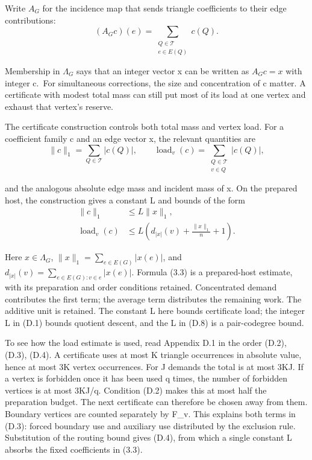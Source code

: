 \documentclass[english,11pt,a4paper]{article}
\begin{document}
Write \(A_G\) for the incidence map that sends triangle coefficients to their edge contributions:
\[(A_Gc)(e)=\sum_{\substack{Q\in\mathcal T\\e\in E(Q)}}c(Q).
                                                                    \tag{3.1}\]

Membership in \(\Lambda_G\) says that an integer vector x can be written as \(A_Gc=x\) with integer c.~For simultaneous corrections, the size and concentration of c matter. A certificate with modest total mass can still put most of its load at one vertex and exhaust that vertex's reserve.

The certificate construction controls both total mass and vertex load. For a coefficient family c and an edge vector x, the relevant quantities are
\[\|c\|_1=\sum_{Q\in\mathcal T}|c(Q)|,
\qquad
\operatorname{load}_v(c)=\sum_{\substack{Q\in\mathcal T\\v\in Q}}|c(Q)|,
                                                                    \tag{3.2}\]

and the analogous absolute edge mass and incident mass of x. On the prepared host, the construction gives a constant L and bounds of the form
\[\begin{aligned}
\|c\|_1&\leq L\|x\|_1,\\
\operatorname{load}_v(c)&\leq
 L\left(d_{|x|}(v)+\frac{\|x\|_1}{n}+1\right).
\end{aligned}                                                       \tag{3.3}\]

Here \(x\in\Lambda_G\), \(\|x\|_1=\sum_{e\in E(G)}|x(e)|\), and \(d_{|x|}(v)=\sum_{e\in E(G):v\in e}|x(e)|\). Formula (3.3) is a prepared-host estimate, with its preparation and order conditions retained. Concentrated demand contributes the first term; the average term distributes the remaining work. The additive unit is retained. The constant L here bounds certificate load; the integer L in (D.1) bounds quotient descent, and the L in (D.8) is a pair-codegree bound.

To see how the load estimate is used, read Appendix D.1 in the order (D.2), (D.3), (D.4). A certificate uses at most K triangle occurrences in absolute value, hence at most 3K vertex occurrences. For J demands the total is at most 3KJ. If a vertex is forbidden once it has been used q times, the number of forbidden vertices is at most 3KJ/q. Condition (D.2) makes this at most half the preparation budget. The next certificate can therefore be chosen away from them. Boundary vertices are counted separately by F\_v. This explains both terms in (D.3): forced boundary use and auxiliary use distributed by the exclusion rule. Substitution of the routing bound gives (D.4), from which a single constant L absorbs the fixed coefficients in (3.3).
\end{document}
